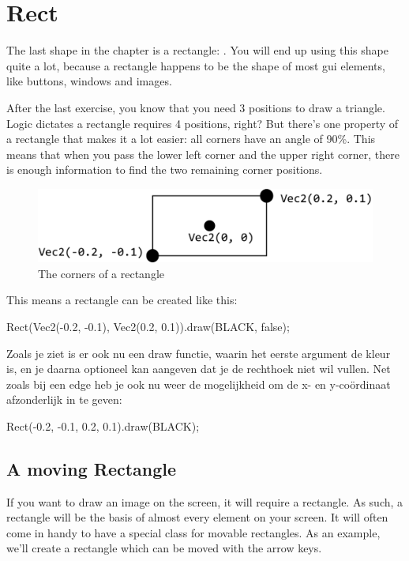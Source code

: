 \section{Rect}
The last shape in the chapter is a rectangle: . You will end up using this shape quite a lot, because a rectangle happens to be the shape of most gui elements, like buttons, windows and images.

After the last exercise, you know that you need 3 positions to draw a triangle. Logic dictates a rectangle requires 4 positions, right? But there's one property of a rectangle that makes it a lot easier: all corners have an angle of 90\%. This means that when you pass the lower left corner and the upper right corner, there is enough information to find the two remaining corner positions.

\begin{figure}[h]
\centering
\includegraphics[width=0.8\linewidth]{../images/rectangle}
\caption[]{The corners of a rectangle}
\label{fig:rect}
\end{figure}

This means a rectangle can be created like this:

\begin{code}
Rect(Vec2(-0.2, -0.1), Vec2(0.2, 0.1)).draw(BLACK, false);
\end{code}

Zoals je ziet is er ook nu een draw functie, waarin het eerste argument de kleur is, en je daarna optioneel kan aangeven dat je de rechthoek niet wil vullen. Net zoals bij een edge heb je ook nu weer de mogelijkheid om de x- en y-co\"ordinaat afzonderlijk in te geven:

\begin{code}
Rect(-0.2, -0.1, 0.2, 0.1).draw(BLACK);
\end{code}

\subsection{A moving Rectangle}
If you want to draw an image on the screen, it will require a rectangle. As such, a rectangle will be the basis of almost every element on your screen. It will often come in handy to have a special class for movable rectangles. As an example, we'll create a rectangle which can be moved with the arrow keys.

